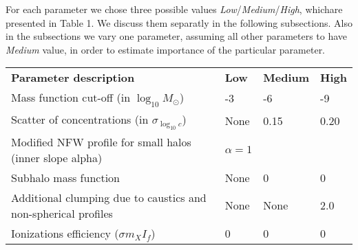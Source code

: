 For each parameter we chose three possible values \textit{Low}/\textit{Medium}/\textit{High}, whichare presented in Table 1. We discuss them separatly in the following subsections. Also in the subsections we vary one parameter, assuming all other parameters to have \textit{Medium} value, in order to estimate importance of the particular parameter.

\begin{table}
    \begin{tabular}{llll}
    \textbf{Parameter description}                                    & \textbf{Low} & \textbf{Medium} & \textbf{High} \hline \hline \\
    Mass function cut-off (in $\log_{10}M_\odot$)        & -3 & -6 & -9 \\
    Scatter of concentrations (in $\sigma_{\log_{10}c}$)              & None & 0.15 & 0.20 \\
    Modified NFW profile for small halos (inner slope alpha) & $\alpha=1$ & \cite{Ishiyama_2014} &  \cite{Ishiyama_2014} \\
    Subhalo mass function & None & 0 & 0 \\
    Additional clumping due to caustics and non-spherical profiles & None & None & 2.0
\\    
    Ionizations efficiency ($\sigma m_X I_f$) & 0 & 0 & 0
\\    \end{tabular}
\end{table}